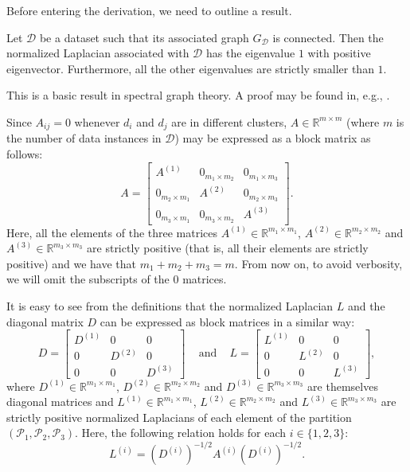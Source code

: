 Before entering the derivation, we need to outline a result.

\begin{proposition}
   \label{bigeigenvalue}
   Let $\mathcal D$ be a dataset such that its associated graph $G_{\mathcal D}$ is connected.
   Then the normalized Laplacian associated with $\mathcal D$ has the eigenvalue $1$ with positive eigenvector.
   Furthermore, all the other eigenvalues are strictly smaller than $1$.
\end{proposition}
This is a basic result in spectral graph theory.
A proof may be found in, e.g., \cite{mahoney}.

Since $A_{ij} = 0$ whenever $d_i$ and $d_j$ are in different clusters, $A \in \mathbb{R} ^{m \times m}$ (where $m$ is the number of data instances in $\mathcal D$) may be expressed as a block matrix as follows:
\begin{equation}
   A = 
   \begin{bmatrix}
      A^{(1)} & 0_{m_1 \times m_2} & 0_{m_1 \times m_3} \\
      0_{m_2 \times m_1} & A^{(2)} & 0_{m_2 \times m_3} \\
      0_{m_3 \times m_1} & 0_{m_3 \times m_2} & A^{(3)}
   \end{bmatrix}.
\end{equation}
Here, all the elements of the three matrices $A^{(1)} \in \mathbb R^{m_1 \times m_1}$, $A^{(2)} \in \mathbb R^{m_2 \times m_2}$ and $A^{(3)} \in \mathbb R ^{m_3 \times m_3}$ are strictly positive (that is, all their elements are strictly positive) and we have that $m_1+m_2+m_3 = m$. 
From now on, to avoid verbosity, we will omit the subscripts of the $0$ matrices.

It is easy to see from the definitions that the normalized Laplacian $L$ and the diagonal matrix $D$ can be expressed as block matrices in a similar way:
\begin{equation}
 D =
   \begin{bmatrix}
      D^{(1)} & 0 & 0 \\
      0 & D^{(2)} & 0 \\
      0 & 0 & D^{(3)}
   \end{bmatrix}
   \,\,\,\,\,\text{ and }\,\,\,\,\,
   L = 
   \begin{bmatrix}
      L^{(1)} & 0 & 0 \\
      0 & L^{(2)} & 0 \\
      0 & 0 & L^{(3)}
   \end{bmatrix},
\end{equation}
where $D^{(1)} \in \mathbb R ^{m_1 \times m_1}$, $D^{(2)} \in \mathbb R ^{m_2 \times m_2}$ and $D^{(3)} \in \mathbb R ^{m_3 \times m_3}$ are themselves diagonal matrices and $L^{(1)} \in \mathbb R ^{m_1 \times m_1}$, $L^{(2)} \in \mathbb R ^{m_2 \times m_2}$ and $L^{(3)} \in \mathbb R ^{m_3 \times m_3}$ are strictly positive normalized Laplacians of each element of the partition $(\mathcal P_1, \mathcal P_2, \mathcal P_3)$.
Here, the following relation holds for each $i \in \{1, 2, 3 \}$:
\begin{equation}
   L^{(i)} = \left( D^{(i)} \right) ^{-1/2} A^{(i)} \left( D^{(i)} \right) ^{-1/2}.
\end{equation}

